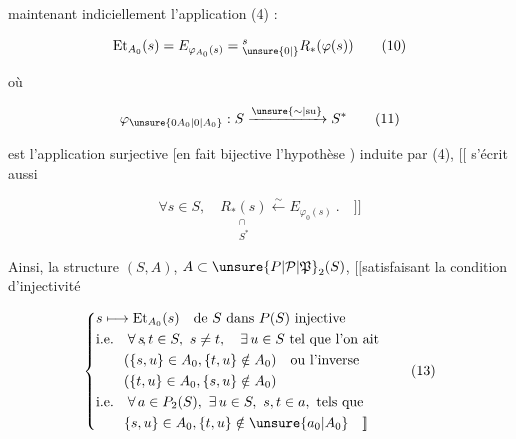 
 maintenant indiciellement l'application (4) :

\[
 \mathrm{Et}_{A_0}(s)=E_{\varphi_{A_0}(s)}={}^{s}_{\unsure{0|\vphantom{1}}}R_*(\varphi(s)) \tag*{(10)}
\]

où

\[
 \varphi_{\unsure{0A_0|0|A_0}}:S\xrightarrow{\unsure{\sim|\mathrm{su}}}S^* \tag*{(11)}
\]

est l'application  surjective [en fait bijective
 l'hypothèse )  induite par (4), 
$[\![$
 s'écrit aussi

\[
 \forall s\in S,\quad \underset{\substack{\cap\\S^*}}{R_*(s)}\xleftarrow{\sim}E_{\varphi_0(s)}\ .\quad ]\!] \tag*{(12)}
\]

Ainsi, la structure  $(S,A)$, $A\subset\unsure{P|\mathcal P|\mathfrak P}_2(S)$, $[\![$satisfaisant
la condition d'injectivité

\[
 \left\{\begin{aligned}
 &s\longmapsto\mathrm{Et}_{A_0}(s)\quad\text{de } S\text{ dans }P(S)\text{ injective}\\
 &\text{i.e.}\quad \forall\,s\!,t\in S,\ s\ne t,\quad\exists\,u\in S\text{ tel que l'on ait}\\
 &\qquad(\{s,u\}\in A_0,\{t,u\}\notin A_0)\quad\text{ou l'inverse}\\
 &\qquad(\{t,u\}\in A_0,\{s,u\}\notin A_0)\\
 &\text{i.e.}\quad \forall\,a\in P_2(S),\ \exists\,u\in S,\ s,t\in a,\text{ tels que}\\
 &\qquad\{s,u\}\in A_0,\{t,u\}\notin \unsure{a_0|A_0}\quad ]\!]
 \end{aligned}\right. \tag*{(13)}
\]

